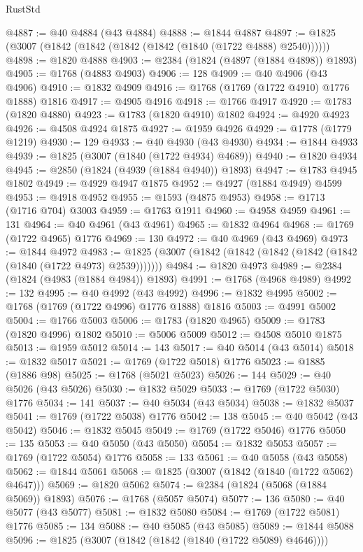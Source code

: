 \begin{lexlean}{RustStd}
\begin{coremodule}
@4887 := @40 @4884 (@43 @4884)
@4888 := @1844 @4887
@4897 := @1825 (@3007 (@1842 (@1842 (@1842 (@1842 (@1840 (@1722 @4888) @2540))))))
@4898 := @1820 @4888
@4903 := @2384 (@1824 (@4897 (@1884 @4898)) @1893)
@4905 := @1768 (@4883 @4903)
@4906 := 128
@4909 := @40 @4906 (@43 @4906)
@4910 := @1832 @4909
@4916 := @1768 (@1769 (@1722 @4910) @1776 @1888) @1816
@4917 := @4905 @4916
@4918 := @1766 @4917
@4920 := @1783 (@1820 @4880)
@4923 := @1783 (@1820 @4910) @1802
@4924 := @4920 @4923
@4926 := @4508 @4924 @1875
@4927 := @1959 @4926
@4929 := @1778 (@1779 @1219)
@4930 := 129
@4933 := @40 @4930 (@43 @4930)
@4934 := @1844 @4933
@4939 := @1825 (@3007 (@1840 (@1722 @4934) @4689))
@4940 := @1820 @4934
@4945 := @2850 (@1824 (@4939 (@1884 @4940)) @1893)
@4947 := @1783 @4945 @1802
@4949 := @4929 @4947 @1875
@4952 := @4927 (@1884 @4949) @4599
@4953 := @4918 @4952
@4955 := @1593 (@4875 @4953)
@4958 := @1713 (@1716 @704) @3003
@4959 := @1763 @1911
@4960 := @4958 @4959
@4961 := 131
@4964 := @40 @4961 (@43 @4961)
@4965 := @1832 @4964
@4968 := @1769 (@1722 @4965) @1776
@4969 := 130
@4972 := @40 @4969 (@43 @4969)
@4973 := @1844 @4972
@4983 := @1825 (@3007 (@1842 (@1842 (@1842 (@1842 (@1842 (@1840 (@1722 @4973) @2539)))))))
@4984 := @1820 @4973
@4989 := @2384 (@1824 (@4983 (@1884 @4984)) @1893)
@4991 := @1768 (@4968 @4989)
@4992 := 132
@4995 := @40 @4992 (@43 @4992)
@4996 := @1832 @4995
@5002 := @1768 (@1769 (@1722 @4996) @1776 @1888) @1816
@5003 := @4991 @5002
@5004 := @1766 @5003
@5006 := @1783 (@1820 @4965)
@5009 := @1783 (@1820 @4996) @1802
@5010 := @5006 @5009
@5012 := @4508 @5010 @1875
@5013 := @1959 @5012
@5014 := 143
@5017 := @40 @5014 (@43 @5014)
@5018 := @1832 @5017
@5021 := @1769 (@1722 @5018) @1776
@5023 := @1885 (@1886 @98)
@5025 := @1768 (@5021 @5023)
@5026 := 144
@5029 := @40 @5026 (@43 @5026)
@5030 := @1832 @5029
@5033 := @1769 (@1722 @5030) @1776
@5034 := 141
@5037 := @40 @5034 (@43 @5034)
@5038 := @1832 @5037
@5041 := @1769 (@1722 @5038) @1776
@5042 := 138
@5045 := @40 @5042 (@43 @5042)
@5046 := @1832 @5045
@5049 := @1769 (@1722 @5046) @1776
@5050 := 135
@5053 := @40 @5050 (@43 @5050)
@5054 := @1832 @5053
@5057 := @1769 (@1722 @5054) @1776
@5058 := 133
@5061 := @40 @5058 (@43 @5058)
@5062 := @1844 @5061
@5068 := @1825 (@3007 (@1842 (@1840 (@1722 @5062) @4647)))
@5069 := @1820 @5062
@5074 := @2384 (@1824 (@5068 (@1884 @5069)) @1893)
@5076 := @1768 (@5057 @5074)
@5077 := 136
@5080 := @40 @5077 (@43 @5077)
@5081 := @1832 @5080
@5084 := @1769 (@1722 @5081) @1776
@5085 := 134
@5088 := @40 @5085 (@43 @5085)
@5089 := @1844 @5088
@5096 := @1825 (@3007 (@1842 (@1842 (@1840 (@1722 @5089) @4646))))

\end{coremodule}
\end{lexlean}
